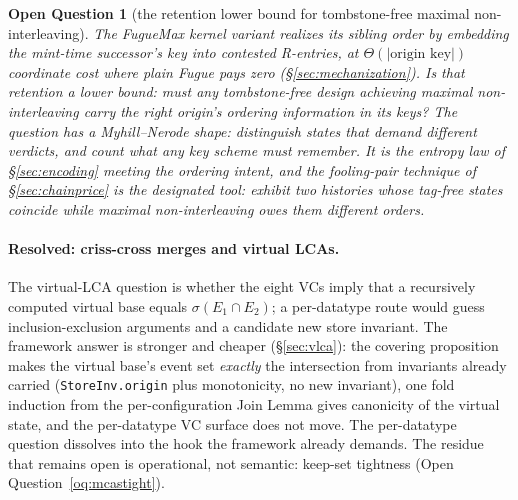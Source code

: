 \documentclass[11pt]{article}
\newtheorem{openq}[theorem]{Open Question}
\newcommand{\lean}[1]{\texttt{#1}}
\begin{document}
\begin{openq}[the retention lower bound for tombstone-free maximal
non-interleaving]
\label{oq:retention}
The FugueMax kernel variant realizes its sibling order by embedding the
mint-time successor's key into contested R-entries, at
$\Theta(|\text{origin key}|)$ coordinate cost where plain Fugue pays
zero (\S\ref{sec:mechanization}). Is that retention a lower bound: must
any tombstone-free design achieving maximal non-interleaving carry the
right origin's ordering information in its keys? The question has a
Myhill--Nerode shape: distinguish states that demand
different verdicts, and count what any key scheme must remember. It is
the entropy law of \S\ref{sec:encoding} meeting the ordering intent,
and the fooling-pair technique of \S\ref{sec:chainprice} is the
designated tool: exhibit two histories whose tag-free states coincide
while maximal non-interleaving owes them different orders.
\end{openq}

\paragraph{Resolved: criss-cross merges and virtual LCAs.} The
virtual-LCA question is whether the eight VCs imply that a recursively
computed virtual base equals $\sigma(E_1 \cap E_2)$; a per-datatype route
would guess inclusion-exclusion arguments and a candidate new store
invariant. The framework answer is stronger and cheaper (\S\ref{sec:vlca}): the
covering proposition makes the virtual base's event set \emph{exactly}
the intersection from invariants already carried
(\lean{StoreInv.origin} plus monotonicity, no new invariant), one fold
induction from the per-configuration Join Lemma gives canonicity of the
virtual state, and the per-datatype VC surface does not move. The
per-datatype question dissolves into the hook the framework already
demands. The residue that remains open is operational, not semantic:
keep-set tightness (Open Question~\ref{oq:mcastight}).
\end{document}
